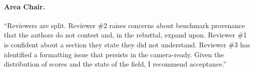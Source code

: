 \documentclass[10pt]{article}
\begin{document}
\paragraph{Area Chair.}
``Reviewers are split. Reviewer \#2 raises concerns about benchmark provenance
that the authors do not contest and, in the rebuttal, expand upon. Reviewer \#1
is confident about a section they state they did not understand. Reviewer \#3
has identified a formatting issue that persists in the camera-ready. Given the
distribution of scores and the state of the field, I recommend acceptance.''
\end{document}
